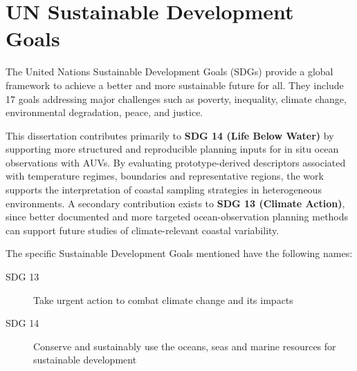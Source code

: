 
\chapter*{UN Sustainable Development Goals} \label{chap:UnitedNations}

The United Nations Sustainable Development Goals (SDGs) provide a global framework to achieve a better and more sustainable future for all.
They include 17 goals addressing major challenges such as poverty, inequality, climate change, environmental degradation, peace, and justice.

This dissertation contributes primarily to \textbf{SDG 14 (Life Below Water)} by supporting more structured and reproducible planning inputs for in situ ocean observations with AUVs.
By evaluating prototype-derived descriptors associated with temperature regimes, boundaries and representative regions, the work supports the interpretation of coastal sampling strategies in heterogeneous environments.
A secondary contribution exists to \textbf{SDG 13 (Climate Action)}, since better documented and more targeted ocean-observation planning methods can support future studies of climate-relevant coastal variability.

The specific Sustainable Development Goals mentioned have the following names:

\begin{description}
\item [SDG 13] Take urgent action to combat climate change and its impacts
\item [SDG 14] Conserve and sustainably use the oceans, seas and marine resources for sustainable development
\end{description}

